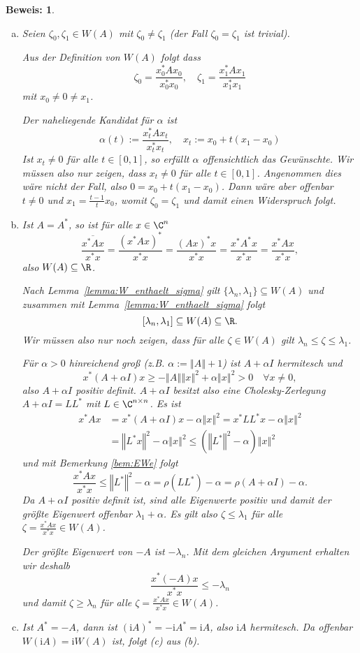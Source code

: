 \documentclass[
]{mycourse}
\theoremstyle{mythm}
\theoremstyle{break}
\newtheorem*{beweis}{Beweis:}
\newcommand{\norm}[1]{\left\Vert#1\right\Vert}		%
\renewcommand{\im}{\ensuremath{\mathrm{i}}} 			      	%
\begin{document}
\begin{beweis}
\begin{enumerate}[(a)]
\item Seien $\zeta_0, \zeta_1\in W(A)$ mit $\zeta_0\neq \zeta_1$ (der Fall $\zeta_0 = \zeta_1$ ist trivial). 

Aus der Definition von $W(A)$ folgt dass
\[
\zeta_0=\frac{x_0^* A x_0}{x_0^*x_0}, \quad \zeta_1=\frac{x_1^* A x_1}{x_1^*x_1}
\]
mit $x_0\neq 0 \neq x_1$. 

Der naheliegende Kandidat für $\alpha$ ist
\[
\alpha(t):=\frac{x_t^* A x_t}{x_t^*x_t}, \quad x_t:=x_0+t(x_1-x_0)
\]
Ist $x_t\neq 0$ für alle $t\in [0,1]$, so erfüllt $\alpha$ offensichtlich das Gewünschte.
Wir müssen also nur zeigen, dass $x_t\neq 0$ für alle $t\in [0,1]$.
Angenommen dies wäre nicht der Fall, also $0=x_0+t(x_1-x_0)$. Dann wäre 
aber offenbar $t\neq 0$ und $x_1=\frac{t-1}{t} x_0$, womit $\zeta_0=\zeta_1$ und damit 
einen Widerspruch folgt.
%
\item Ist $A=A^*$, so ist für alle $x\in \C^n$
\[
\overline{\frac{x^* A x}{x^*x}}=\frac{( x^* A x )^*}{x^*x}
= \frac{ (A x)^* x}{x^*x}=\frac{ x^* A^* x}{x^*x}
=\frac{ x^* A x}{x^*x},
\]
also $W(A)\subseteq \R$.

Nach Lemma~\ref{lemma:W_enthaelt_sigma} gilt $\{\lambda_n,\lambda_1\}\subseteq W(A)$ und
zusammen mit Lemma~\ref{lemma:W_enthaelt_sigma} folgt 
\[
[\lambda_n,\lambda_1]\subseteq W(A)\subseteq \R.
\] 
Wir müssen also nur noch zeigen, dass für alle $\zeta\in W(A)$ gilt $\lambda_n\leq \zeta\leq \lambda_1$.

Für $\alpha>0$ hinreichend groß (z.B. $\alpha:=\norm{A}+1$) ist $A+\alpha I$ hermitesch und 
\[
x^*(A+\alpha I)x\geq -\norm{A}\norm{x}^2 + \alpha \norm{x}^2>0 \quad \forall x\neq 0,
\]
also $A+\alpha I$ positiv definit. 
$A + \alpha I$ besitzt also eine Cholesky-Zerlegung $A + \alpha I=LL^*$ mit $L\in \C^{n\times n}$.
Es ist
\begin{align*}
x^*A x 
&= x^* (A+\alpha I) x- \alpha \norm{x}^2
= x^* LL^* x- \alpha \norm{x}^2 \\
&= \norm{L^*x}^2 - \alpha \norm{x}^2
\leq (\norm{L^*}^2-\alpha)\norm{x}^2
\end{align*}
und mit Bemerkung \ref{bem:EWe} folgt
\[
\frac{x^*A x}{x^* x} \leq \norm{L^*}^2-\alpha=\rho(LL^*)-\alpha=\rho(A+\alpha I)-\alpha.
\]
Da $A+\alpha I$ positiv definit ist, sind alle Eigenwerte positiv und damit der größte Eigenwert offenbar $\lambda_1+\alpha$.
Es gilt also $\zeta\leq \lambda_1$ für alle $\zeta=\frac{x^*A x}{x^* x}\in W(A)$. 

Der größte Eigenwert von $-A$ ist $-\lambda_n$. Mit dem gleichen Argument erhalten wir deshalb
\[
\frac{x^* (-A) x}{x^* x} \leq -\lambda_n
\]
und damit $\zeta\geq \lambda_n$ für alle $\zeta=\frac{x^*A x}{x^* x}\in W(A)$.

\item Ist $A^*=-A$, dann ist $(\im A)^*=-\im A^*=\im A$, also $\im A$ hermitesch. Da offenbar $W(\im A)=\im W(A)$ ist, folgt (c) aus (b).
\end{enumerate}
\end{beweis}
\end{document}
